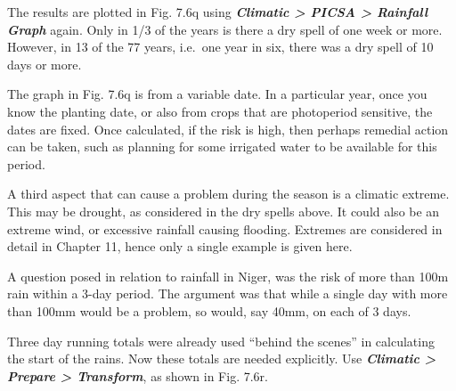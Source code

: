 \documentclass[
  letterpaper,
  DIV=11,
  numbers=noendperiod]{scrreprt}
\begin{document}
The results are plotted in Fig. 7.6q using \textbf{\emph{Climatic
\textgreater{} PICSA \textgreater{} Rainfall Graph}} again. Only in 1/3
of the years is there a dry spell of one week or more. However, in 13 of
the 77 years, i.e.~one year in six, there was a dry spell of 10 days or
more.

The graph in Fig. 7.6q is from a variable date. In a particular year,
once you know the planting date, or also from crops that are photoperiod
sensitive, the dates are fixed. Once calculated, if the risk is high,
then perhaps remedial action can be taken, such as planning for some
irrigated water to be available for this period.

A third aspect that can cause a problem during the season is a climatic
extreme. This may be drought, as considered in the dry spells above. It
could also be an extreme wind, or excessive rainfall causing flooding.
Extremes are considered in detail in Chapter 11, hence only a single
example is given here.

A question posed in relation to rainfall in Niger, was the risk of more
than 100m rain within a 3-day period. The argument was that while a
single day with more than 100mm would be a problem, so would, say 40mm,
on each of 3 days.

Three day running totals were already used ``behind the scenes'' in
calculating the start of the rains. Now these totals are needed
explicitly. Use \textbf{\emph{Climatic \textgreater{} Prepare
\textgreater{} Transform}}, as shown in Fig. 7.6r.
\end{document}
